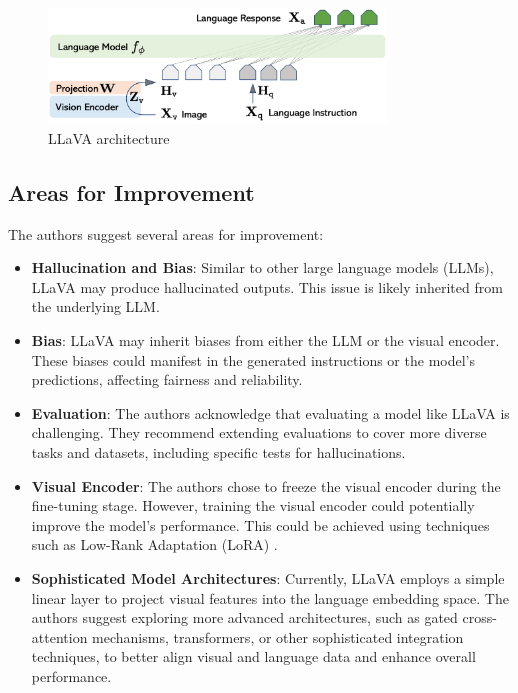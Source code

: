 \documentclass[onecolumn]{IEEEtran}
\begin{document}
\begin{figure}[H]
    \centering
    \includegraphics[width=0.8\textwidth]{images/llava_architecture.png}
    \caption{LLaVA architecture}
    \label{fig:llava_architecture}
\end{figure}

\subsection{Areas for Improvement}
The authors suggest several areas for improvement:
\begin{itemize}
    \item \textbf{Hallucination and Bias}: Similar to other large language models (LLMs), LLaVA may produce hallucinated outputs. This issue is likely inherited from the underlying LLM.
    \item \textbf{Bias}: LLaVA may inherit biases from either the LLM or the visual encoder. These biases could manifest in the generated instructions or the model's predictions, affecting fairness and reliability.
    \item \textbf{Evaluation}: The authors acknowledge that evaluating a model like LLaVA is challenging. They recommend extending evaluations to cover more diverse tasks and datasets, including specific tests for hallucinations.
    \item \textbf{Visual Encoder}: The authors chose to freeze the visual encoder during the fine-tuning stage. However, training the visual encoder could potentially improve the model's performance. This could be achieved using techniques such as Low-Rank Adaptation (LoRA) \cite{hu2021lora}.
    \item \textbf{Sophisticated Model Architectures}: Currently, LLaVA employs a simple linear layer to project visual features into the language embedding space. The authors suggest exploring more advanced architectures, such as gated cross-attention mechanisms, transformers, or other sophisticated integration techniques, to better align visual and language data and enhance overall performance.
\end{itemize}
\end{document}
